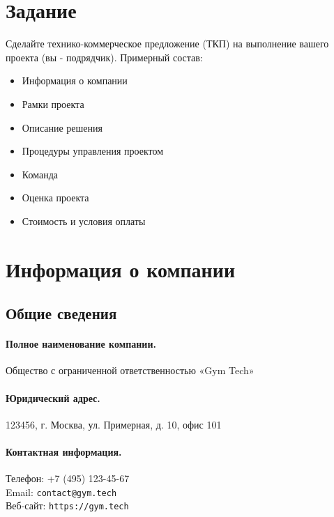 \documentclass[14pt, russian]{matmex-diploma-custom}
\begin{document}

\maketitle
\section*{Задание}
    Сделайте технико-коммерческое предложение (ТКП) на выполнение вашего проекта (вы - подрядчик).
    Примерный состав:
    \begin{itemize}
        \item Информация о компании
        \item Рамки проекта
        \item Описание решения
        \item Процедуры управления проектом
        \item Команда
        \item Оценка проекта
        \item Стоимость и условия оплаты
\end{itemize}

\section{Информация о компании}

\subsection{Общие сведения}

\paragraph{Полное наименование компании.}
Общество с ограниченной ответственностью «Gym Tech»

\paragraph{Юридический адрес.}
123456, г. Москва, ул. Примерная, д. 10, офис 101

\paragraph{Контактная информация.}
Телефон: +7 (495) 123-45-67 \\
Email: \texttt{contact@gym.tech} \\
Веб-сайт: \texttt{https://gym.tech}
\end{document}
